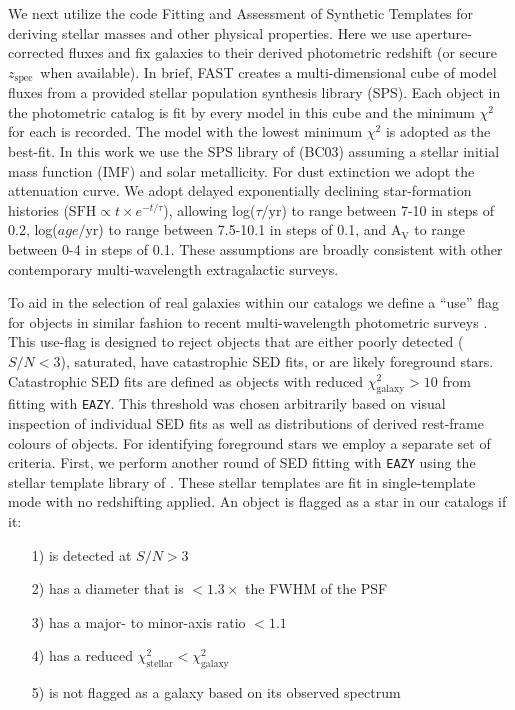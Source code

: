 \documentclass[a4paper,fleqn,usenatbib]{mnras}
\def\zspec{$z_{\mathrm{spec}}$}
\begin{document}
We next utilize the code Fitting and Assessment of Synthetic Templates \citep[{\tt FAST}:][]{Kriek2009} for deriving stellar masses and other physical properties.
Here we use aperture-corrected fluxes
and fix galaxies to their derived photometric redshift (or secure \zspec\ when available).
In brief, FAST creates a multi-dimensional cube of model fluxes from a provided stellar population synthesis library (SPS).
Each object in the photometric catalog is fit by every model in this cube and the minimum $\chi^2$ for each is recorded.
The model with the lowest minimum $\chi^2$ is adopted as the best-fit.
In this work we use the SPS library of \citet{Bruzual2003} (BC03) assuming a \citet{Chabrier2003} stellar initial mass function (IMF) and solar metallicity.
For dust extinction we adopt the \citet{Calzetti2000} attenuation curve.
We adopt delayed exponentially declining star-formation histories ($\mathrm{SFH} \propto t \times e^{-t / \tau}$), allowing log($\tau/\mathrm{yr}$) to range between 7-10 in steps of 0.2, log($age/\mathrm{yr}$) to range between 7.5-10.1 in steps of 0.1, and $\mathrm{A_V}$ to range between 0-4 in steps of 0.1.
These assumptions are broadly consistent with other contemporary multi-wavelength extragalactic surveys.


To aid in the selection of real galaxies within our catalogs we define a ``use'' flag for objects in similar fashion to recent multi-wavelength photometric surveys \citep{Whitaker2011, Muzzin2013a, Skelton2014, Straatman2016}.
This use-flag is designed to reject objects that are either poorly detected ($S/N < 3$), saturated, have catastrophic SED fits, or are likely foreground stars.
Catastrophic SED fits are defined as objects with reduced $\chi^2_{\mathrm{galaxy}} > 10$ from fitting with {\tt EAZY}.
This threshold was chosen arbitrarily based on visual inspection of individual SED fits as well as distributions of derived rest-frame colours of objects.
For identifying foreground stars we employ a separate set of criteria.
First, we perform another round of SED fitting with {\tt EAZY} using the stellar template library of \citet{Pickles1998}.
These stellar templates are fit in single-template mode with no redshifting applied.
An object is flagged as a star in our catalogs if it:


\begin{enumerate}
\item[1)] is detected at $S/N > 3$ \\[-4mm]
\item[2)] has a diameter that is $<1.3 \times$ the FWHM of the PSF \\[-4mm]
\item[3)] has a major- to minor-axis ratio $<1.1$ \\[-4mm]
\item[4)] has a reduced $\chi^2_{\mathrm{stellar}} < \chi^2_{\mathrm{galaxy}}$ \\[-4mm]
\item[5)] is not flagged as a galaxy based on its observed spectrum
\end{enumerate}
\end{document}
